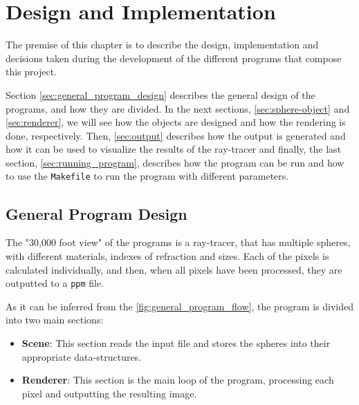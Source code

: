 \chapter{Design and Implementation}\label{chap:design}

The premise of this chapter is to describe the design, implementation and decisions taken during the development of the different programs that compose this project.

Section \autoref{sec:general_program_design} describes the general design of the programs, and how they are divided. In the next sections, \autoref{sec:sphere-object} and \autoref{sec:renderer}, we will see how the objects are designed and how the rendering is done, respectively. Then, \autoref{sec:output} describes how the output is generated and how it can be used to visualize the results of the ray-tracer and finally, the last section, \autoref{sec:running_program}, describes how the program can be run and how to use the \texttt{Makefile} to run the program with different parameters.

\section{General Program Design}
\label{sec:general_program_design}
The "30,000 foot view" of the programs is a ray-tracer, that has multiple spheres, with different materials, indexes of refraction and sizes. Each of the pixels is calculated individually, and then, when all pixels have been processed, they are outputted to a \texttt{ppm} file.

As it can be inferred from the \autoref{fig:general_program_flow}, the program is divided into two main sections:
\begin{itemize}
    \item \textbf{Scene}: This section reads the input file and stores the spheres into their appropriate data-structures.
    \item \textbf{Renderer}: This section is the main loop of the program, processing each pixel and outputting the resulting image.
\end{itemize}



